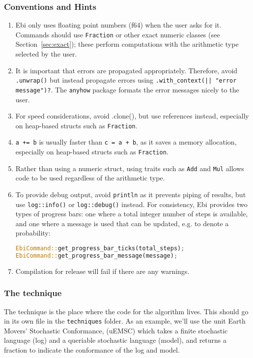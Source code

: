 \documentclass{article}
\begin{document}
		\subsubsection{Conventions and Hints}
			\begin{enumerate}
				\item Ebi only uses floating point numbers (f64) when the user asks for it.
				Commands should use \verb=Fraction= or other exact numeric classes (see Section~\ref{sec:exact}); these perform computations with the arithmetic type selected by the user.
				\item It is important that errors are propagated appropriately.
				Therefore, avoid \verb=.unwrap()= but instead propagate errors using \verb=.with_context(|| "error message")?=.
				The \verb=anyhow= package formats the error messages nicely to the user.
				\item For speed considerations, avoid .clone(), but use references instead, especially on heap-based structs such as \verb=Fraction=.
				\item \verb|a += b| is usually faster than \verb|c = a + b|, as it saves a memory allocation, especially on heap-based structs such as \verb=Fraction=.
				\item Rather than using a numeric struct, using traits such as \verb=Add= and \verb=Mul= allows code to be used regardless of the arithmetic type.
				\item To provide debug output, avoid \verb=println= as it prevents piping of results, but use \verb=log::info()= or \verb=log::debug()= instead.
				For consistency, Ebi provides two types of progress bars: one where a total integer number of steps is available, and one where a message is used that can be updated, e.g. to denote a probability:
\begin{lstlisting}[language=Rust, style=boxed]
EbiCommand::get_progress_bar_ticks(total_steps);
EbiCommand::get_progress_bar_message(message);
\end{lstlisting}
                \item Compilation for release will fail if there are any warnings.
			\end{enumerate}
            
		\subsubsection{The technique}
			The technique is the place where the code for the algorithm lives.
			This should go in its own file in the \verb=techniques= folder.
			As an example, we'll use the unit Earth Movers' Stochastic Conformance, (uEMSC) which takes a finite stochastic language (log) and a queriable stochastic language (model), and returns a fraction to indicate the conformance of the log and model.
			
\end{document}
